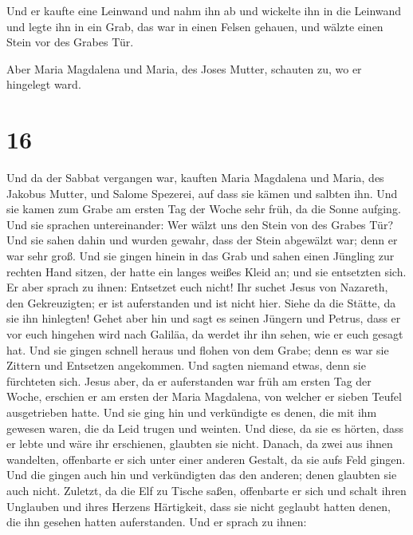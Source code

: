  Und er kaufte eine Leinwand und nahm ihn ab und wickelte
ihn in die Leinwand und legte ihn in ein Grab, das war in einen Felsen
gehauen, und wälzte einen Stein vor des Grabes Tür.

 Aber Maria Magdalena und Maria, des Joses Mutter,
schauten zu, wo er hingelegt ward.

\hypertarget{section-15}{%
\section{16}\label{section-15}}

 Und da der Sabbat vergangen war, kauften Maria Magdalena
und Maria, des Jakobus Mutter, und Salome Spezerei, auf dass sie kämen
und salbten ihn.  Und sie kamen zum Grabe am ersten Tag
der Woche sehr früh, da die Sonne aufging.  Und sie
sprachen untereinander: Wer wälzt uns den Stein von des Grabes Tür?
 Und sie sahen dahin und wurden gewahr, dass der Stein
abgewälzt war; denn er war sehr groß.  Und sie gingen
hinein in das Grab und sahen einen Jüngling zur rechten Hand sitzen, der
hatte ein langes weißes Kleid an; und sie entsetzten sich.
 Er aber sprach zu ihnen: Entsetzet euch nicht! Ihr suchet
Jesus von Nazareth, den Gekreuzigten; er ist auferstanden und ist nicht
hier. Siehe da die Stätte, da sie ihn hinlegten!  Gehet
aber hin und sagt es seinen Jüngern und Petrus, dass er vor euch
hingehen wird nach Galiläa, da werdet ihr ihn sehen, wie er euch gesagt
hat.  Und sie gingen schnell heraus und flohen von dem
Grabe; denn es war sie Zittern und Entsetzen angekommen. Und sagten
niemand etwas, denn sie fürchteten sich.  Jesus aber, da
er auferstanden war früh am ersten Tag der Woche, erschien er am ersten
der Maria Magdalena, von welcher er sieben Teufel ausgetrieben hatte.
 Und sie ging hin und verkündigte es denen, die mit ihm
gewesen waren, die da Leid trugen und weinten.  Und
diese, da sie es hörten, dass er lebte und wäre ihr erschienen, glaubten
sie nicht.  Danach, da zwei aus ihnen wandelten,
offenbarte er sich unter einer anderen Gestalt, da sie aufs Feld gingen.
 Und die gingen auch hin und verkündigten das den
anderen; denen glaubten sie auch nicht.  Zuletzt, da die
Elf zu Tische saßen, offenbarte er sich und schalt ihren Unglauben und
ihres Herzens Härtigkeit, dass sie nicht geglaubt hatten denen, die ihn
gesehen hatten auferstanden.  Und er sprach zu ihnen:
